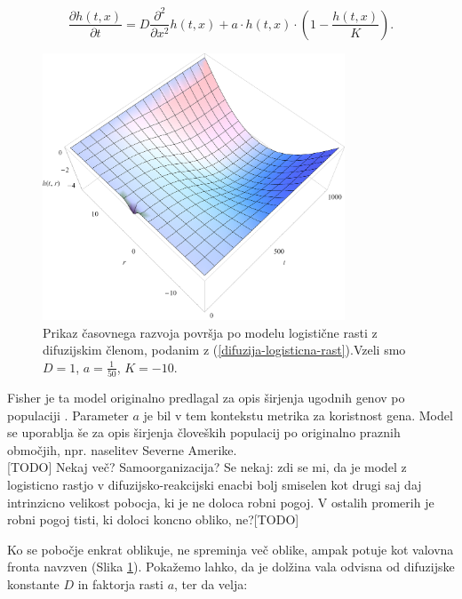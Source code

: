 \documentclass[a4paper, twoside, 12pt]{book}
\begin{document}
    \begin{equation}
      \frac{ \partial h(t,x) }{ \partial t} = D \frac{\partial^2}{\partial x^2} h(t,x) + a \cdot h(t,x) \cdot (1 - \frac{h(t,x)}{K}).
      \label{difuzija-logisticna-rast}
    \end{equation}
    \begin{figure}[h!]
      \begin{center}
        \includegraphics[width=9cm]{slike/difuzija-logisticna-rast2}
      \end{center}
      \caption{Prikaz časovnega razvoja površja po modelu logistične rasti z difuzijskim členom, podanim z (\ref{difuzija-logisticna-rast}).Vzeli smo $D=1$, $a=\frac{1}{50}$, $K=-10$.}
      \label{fig:difuzija-logisticna-rast}
    \end{figure}

Fisher je ta model originalno predlagal za opis širjenja ugodnih genov po populaciji \cite{broadbridge2002huxley}. Parameter $a$ je bil v tem kontekstu metrika za koristnost gena. Model se uporablja še za opis širjenja človeških populacij po originalno praznih območjih, npr. naselitev Severne Amerike.\\

[TODO] Nekaj več? Samoorganizacija?
Se nekaj: zdi se mi, da je model z logisticno rastjo v difuzijsko-reakcijski enacbi
bolj smiselen kot drugi saj daj intrinzicno velikost pobocja, ki je ne doloca robni
pogoj. V ostalih promerih je robni pogoj tisti, ki doloci koncno obliko, ne?[TODO]

Ko se pobočje enkrat oblikuje, ne spreminja več oblike, ampak potuje kot valovna fronta navzven (Slika \ref{fig:difuzija-logisticna-rast}). Pokažemo lahko, da je dolžina vala odvisna od difuzijske konstante $D$ in faktorja rasti $a$, ter da velja: 
\end{document}
